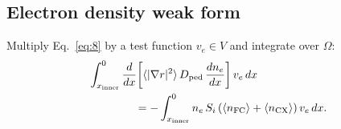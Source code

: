\documentclass[twocolumn,secnumarabic,amssymb, nobibnotes, aps, prd]{revtex4-2}
\begin{document}

\subsection{Electron density weak form}
\label{sec:ne-weak}

Multiply Eq.~\eqref{eq:8} by a test function $v_e \in V$ and
integrate over $\Omega$:
\begin{align}
  \int_{x_{\mathrm{inner}}}^{0}
    \frac{d}{dx}\!&\left[\langle|\nabla r|^{2}\rangle\,D_{\mathrm{ped}}\,\frac{dn_e}{dx}\right] v_e \, dx
  \notag \\ &= -\int_{x_{\mathrm{inner}}}^{0} n_e\,S_i\,(\langle n_{\mathrm{FC}}\rangle + \langle n_{\mathrm{CX}}\rangle)\, v_e \, dx.
  \label{eq:ne-weighted}
\end{align}
\end{document}
